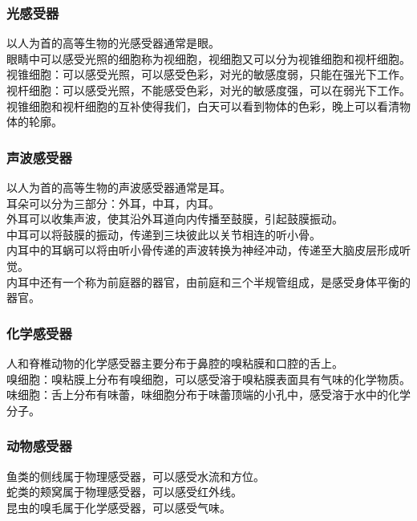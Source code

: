 \documentclass[UTF8]{ctexart}
\begin{document}
\subsubsection{光感受器}
    以人为首的高等生物的光感受器通常是眼。\\[3mm]
    眼睛中可以感受光照的细胞称为视细胞，视细胞又可以分为视锥细胞和视杆细胞。\\[3mm]
    视锥细胞：可以感受光照，可以感受色彩，对光的敏感度弱，只能在强光下工作。\\[3mm]
    视杆细胞：可以感受光照，不能感受色彩，对光的敏感度强，可以在弱光下工作。\\[3mm]
    视锥细胞和视杆细胞的互补使得我们，白天可以看到物体的色彩，晚上可以看清物体的轮廓。

\subsubsection{声波感受器}
    以人为首的高等生物的声波感受器通常是耳。\\[3mm]
    耳朵可以分为三部分：外耳，中耳，内耳。\\[3mm]
    外耳可以收集声波，使其沿外耳道向内传播至鼓膜，引起鼓膜振动。\\[3mm]
    中耳可以将鼓膜的振动，传递到三块彼此以关节相连的听小骨。\\[3mm]
    内耳中的耳蜗可以将由听小骨传递的声波转换为神经冲动，传递至大脑皮层形成听觉。\\[3mm]
    内耳中还有一个称为前庭器的器官，由前庭和三个半规管组成，是感受身体平衡的器官。

\subsubsection{化学感受器}
    人和脊椎动物的化学感受器主要分布于鼻腔的嗅粘膜和口腔的舌上。\\[3mm]
    嗅细胞：嗅粘膜上分布有嗅细胞，可以感受溶于嗅粘膜表面具有气味的化学物质。\\[3mm]
    味细胞：舌上分布有味蕾，味细胞分布于味蕾顶端的小孔中，感受溶于水中的化学分子。

\newpage

\subsubsection{动物感受器}
    鱼类的侧线属于物理感受器，可以感受水流和方位。\\[3mm]
    蛇类的颊窝属于物理感受器，可以感受红外线。\\[3mm]
    昆虫的嗅毛属于化学感受器，可以感受气味。
\end{document}
